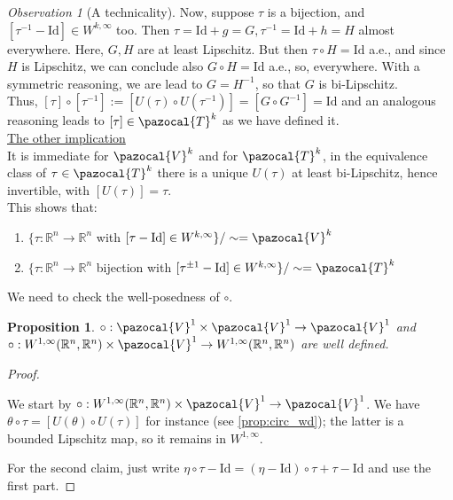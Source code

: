 \documentclass[english,a4paper,9pt,oneside]{scrbook}	%
\theoremstyle{break}
\newtheorem{prop}[equation]{Proposition}
\newenvironment{mproof}[1][\proofname]{%
  \begin{proof}[#1]$ $\par\nobreak\ignorespaces
}{%
  \end{proof}
}
\renewcommand*{\proofname}{Proof}
\theoremstyle{remark}
\newtheorem{obs}[equation]{Observation}
\newcommand{\mR}{\mathbb{R}}
\newcommand{\cV}{\pazocal{V}}
\newcommand{\cT}{\pazocal{T}}
\newcommand{\id}{\text{Id}}
\newcommand{\te}{\theta}
\begin{document}
\begin{appendices}
\begin{obs}[A technicality]
Now, suppose $\tau$ is a bijection, and $[\tau^{-1}-\id] \in W^{k,\infty}$ too. Then $\tau = \id + g = G, \tau^{-1} = \id + h = H$ almost everywhere. Here, $G,H$ are at least Lipschitz.
But then $\tau \circ H = \id $ a.e., and since $H$ is Lipschitz, we can conclude also $G\circ H = \id$ a.e., so, everywhere. With a symmetric reasoning, we are lead to $G=H^{-1}$, so that $G$ is bi-Lipschitz. \mbox{}\\

Thus, $[\tau]\circ [\tau^{-1}]:=[U(\tau)\circ U(\tau^{-1})] = [G\circ G^{-1}] = \id$ and an analogous reasoning leads to $[\tau] \in \cT^k$ as we have defined it. \mbox{}\\

\underline{The other implication} \mbox{}\\

It is immediate for $\cV^k$ and for $\cT^k$, in the equivalence class of $\tau \in \cT^k$ there is a unique $U(\tau)$ at least bi-Lipschitz, hence invertible, with $[U(\tau)]=\tau$. \mbox{}\\

This shows that:

\begin{enumerate}
\item $\{\tau: \mR^n\rightarrow\mR^n$ with $[\tau-\id] \in W^{k,\infty}\} / \sim = \cV^k$
\item $\{\tau: \mR^n\rightarrow\mR^n$ bijection with $[\tau^{\pm 1}-\id] \in W^{k,\infty}\}/\sim = \cT^k$
\end{enumerate}

\end{obs}

We need to check the well-posedness of $\circ$.

\begin{prop}
\label{prop:circ_wd_V}
$\circ: \cV^1 \times \cV^1 \rightarrow \cV^1$ and $\circ:W^{1,\infty}(\mR^n,\mR^n) \times \cV^1 \rightarrow W^{1,\infty}(\mR^n,\mR^n)$ are well defined.
\end{prop}
\begin{mproof}

We start by $\circ:W^{1,\infty}(\mR^n,\mR^n) \times \cV^1 \rightarrow \cV^1$. We have $\te\circ \tau =[ U(\te)\circ U(\tau)]$ for instance (see \cref{prop:circ_wd}); the latter is a bounded Lipschitz map, so it remains in $W^{1,\infty}$.

For the second claim, just write $\eta \circ \tau -\id = (\eta - \id)\circ \tau + \tau -\id$ and use the first part. 


\end{mproof}
\end{appendices}
\end{document}
